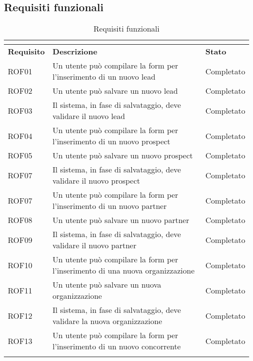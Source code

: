 \subsection*{Requisiti funzionali}
\begin{longtable}[h]{|p{2.5cm}|p{8cm}|p{2.5cm}|}
	\caption{Requisiti funzionali}\\
	\label{tab:requisiti-funzionali}\\
	\hline
	\rule[-4mm]{0mm}{1cm}	
	\textbf{Requisito} & \textbf{Descrizione} & \textbf{Stato}\\
	\hline
	\rule[-3mm]{0mm}{0.8cm}	
	ROF01&Un utente può compilare la form per l'inserimento di un nuovo lead&Completato\\
	\hline
	\rule[-3mm]{0mm}{0.8cm}
	ROF02&Un utente può salvare un nuovo lead&Completato\\
	\hline
	\rule[-3mm]{0mm}{0.8cm}
	ROF03&Il sistema, in fase di salvataggio, deve validare il nuovo lead &Completato\\
	\hline
	\rule[-3mm]{0mm}{0.8cm}
	ROF04&Un utente può compilare la form per l'inserimento di un nuovo prospect &Completato\\
	\hline
	\rule[-3mm]{0mm}{0.8cm}
	ROF05&Un utente può salvare un nuovo prospect&Completato\\
	\hline
	\rule[-3mm]{0mm}{0.8cm}
	ROF07&Il sistema, in fase di salvataggio, deve validare il nuovo prospect&Completato \\
	\hline
	\rule[-3mm]{0mm}{0.8cm}
	ROF07&Un utente può compilare la form per l'inserimento di un nuovo partner  & Completato\\
	\hline
	\rule[-3mm]{0mm}{0.8cm}
	ROF08&Un utente può salvare un nuovo partner&Completato\\
	\hline
	\rule[-3mm]{0mm}{0.8cm}
	ROF09&Il sistema, in fase di salvataggio, deve validare il nuovo partner&Completato \\
	\hline
	\rule[-3mm]{0mm}{0.8cm}
	ROF10&Un utente può compilare la form per l'inserimento di una nuova organizzazione  & Completato\\
	\hline
	\rule[-3mm]{0mm}{0.8cm}
	ROF11&Un utente può salvare un nuova organizzazione&Completato\\
	\hline
	\rule[-3mm]{0mm}{0.8cm}
	ROF12&Il sistema, in fase di salvataggio, deve validare la nuova organizzazione&Completato \\
	\hline
	\rule[-3mm]{0mm}{0.8cm}
	ROF13&Un utente può compilare la form per l'inserimento di un nuovo concorrente  & Completato\\
	\hline
	\rule[-3mm]{0mm}{0.8cm}

\end{longtable}
